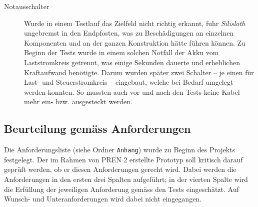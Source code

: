 \begin{description}
    \item[Notausschalter] Wurde in einem Testlauf das Zielfeld nicht richtig erkannt, fuhr \textit{Silisloth} ungebremst in den Endpfosten, was zu Beschädigungen an einzelnen Komponenten und an der ganzen Konstruktion hätte führen können. Zu Beginn der Tests wurde in einem solchen Notfall der Akku vom Laststromkreis getrennt, was einige Sekunden dauerte und erheblichen Kraftaufwand benötigte. Darum wurden später zwei Schalter -- je einen für Last- und Steuerstromkreis -- eingebaut, welche bei Bedarf umgelegt werden konnten. So mussten auch vor und nach den Tests keine Kabel mehr ein- bzw. ausgesteckt werden.
\end{description}

\subsection{Beurteilung gemäss Anforderungen}

Die Anforderungsliste (siehe Ordner \texttt{Anhang}) wurde zu Beginn des Projekts festgelegt. Der im Rahmen von PREN 2 erstellte Prototyp soll kritisch darauf geprüft werden, ob er diesen Anforderungen gerecht wird. Dabei werden die Anforderungen in den ersten drei Spalten aufgeführt; in der vierten Spalte wird die Erfüllung der jeweiligen Anforderung gemäss den Tests eingeschätzt. Auf Wunsch- und Unteranforderungen wird dabei nicht eingegangen.

